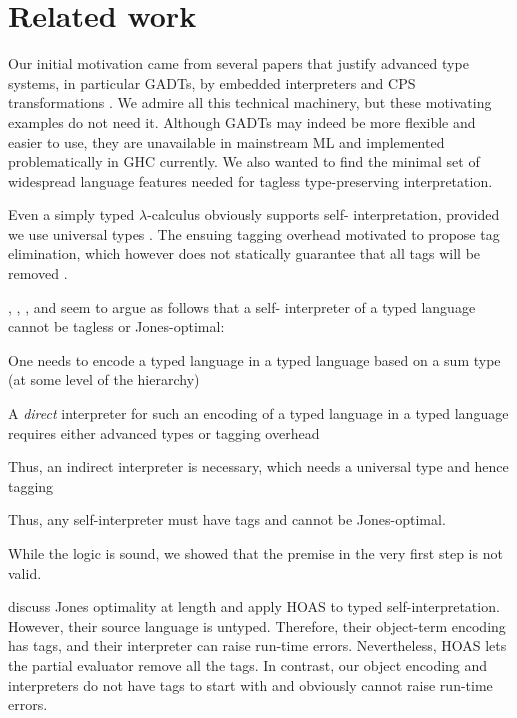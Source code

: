 \section{Related work}\label{related}

Our initial motivation came from several papers that justify advanced
type systems, in particular GADTs, by embedded interpreters
\citep{WalidICFP02,taha-tag,xi-guarded,peyton-jones-simple} and
CPS transformations \citep{Guillemette-Monier-PLPV,chen-typeful}.
We admire all this technical machinery, but
these motivating examples do not need it.
Although GADTs may indeed be more flexible and easier to use, they are
unavailable in mainstream ML and implemented problematically
in GHC currently. We also wanted to find the minimal
set of widespread language features needed for tagless
type-preserving interpretation.

Even a simply typed $\lambda$-calculus obviously supports self\hyp
interpretation, provided we use universal types \cite{taha-tag}.  The
ensuing tagging overhead motivated \citet{taha-tag} to propose tag
elimination, which however does not statically guarantee that all tags
will be removed \cite{WalidICFP02}.

, \citet{taha-tag}, \citet{xi-guarded}, and
\citet{peyton-jones-simple} seem to argue as follows that a self\hyp
interpreter of a typed language cannot be tagless or Jones\hyp optimal:
\begin{shortlist}
\item One needs to encode a typed language in a typed language based on
a sum type (at some level of the hierarchy)\\
\item A \emph{direct} interpreter 
for such an encoding of a typed language
in a typed language requires either
advanced types or tagging overhead\\
\item Thus, an indirect interpreter is necessary, which needs a universal
  type and hence tagging\ifshort\else\\
\item Thus, any self-interpreter must have tags and cannot be 
  Jones-optimal\fi.
\end{shortlist}
While the logic is sound, we showed that the premise in the very first step
is not valid.

\citet{Danvy-tagging-encoding} discuss Jones optimality at length and
apply HOAS to typed self\hyp interpretation.  However, their source
language is untyped.  Therefore, their object\hyp term encoding has
tags, and their interpreter can raise run-time errors.
Nevertheless, HOAS lets the partial
evaluator remove all the tags. In contrast, our object encoding and
interpreters do not have tags to start with and obviously cannot
raise run-time errors.

